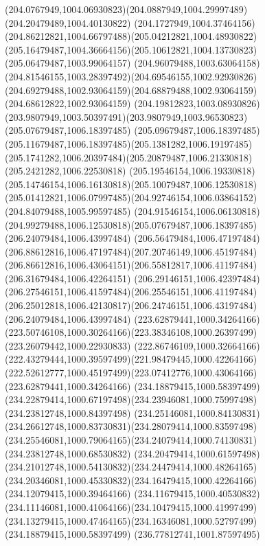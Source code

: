 {    \curveto(204.0767949,1004.06930823)(204.0887949,1004.29997489)(204.20479489,1004.40130822)
    \curveto(204.1727949,1004.37464156)(204.86212821,1004.66797488)(205.04212821,1004.48930822)
    \curveto(205.16479487,1004.36664156)(205.10612821,1004.13730823)(205.06479487,1003.99064157)
    \curveto(204.96079488,1003.63064158)(204.81546155,1003.28397492)(204.69546155,1002.92930826)
    \curveto(204.69279488,1002.93064159)(204.68879488,1002.93064159)(204.68612822,1002.93064159)
    \curveto(204.19812823,1003.08930826)(203.9807949,1003.50397491)(203.9807949,1003.96530823)
    \moveto(205.07679487,1006.18397485)
    \curveto(205.09679487,1006.18397485)(205.11679487,1006.18397485)(205.1381282,1006.19197485)
    \curveto(205.1741282,1006.20397484)(205.20879487,1006.21330818)(205.2421282,1006.22530818)
    \curveto(205.19546154,1006.19330818)(205.14746154,1006.16130818)(205.10079487,1006.12530818)
    \curveto(205.01412821,1006.07997485)(204.92746154,1006.03864152)(204.84079488,1005.99597485)
    \curveto(204.91546154,1006.06130818)(204.99279488,1006.12530818)(205.07679487,1006.18397485)
    \moveto(206.24079484,1006.43997484)
    \curveto(206.56479484,1006.47197484)(206.88612816,1006.47197484)(207.20746149,1006.45197484)
    \curveto(206.86612816,1006.43064151)(206.55812817,1006.41197484)(206.31679484,1006.42264151)
    \curveto(206.29146151,1006.42397484)(206.27546151,1006.41597484)(206.25546151,1006.41197484)
    \curveto(206.25012818,1006.42130817)(206.24746151,1006.43197484)(206.24079484,1006.43997484)
    \moveto(223.62879441,1000.34264166)
    \curveto(223.50746108,1000.30264166)(223.38346108,1000.26397499)(223.26079442,1000.22930833)
    \curveto(222.86746109,1000.32664166)(222.43279444,1000.39597499)(221.98479445,1000.42264166)
    \curveto(222.52612777,1000.45197499)(223.07412776,1000.43064166)(223.62879441,1000.34264166)
    \moveto(234.18879415,1000.58397499)
    \curveto(234.22879414,1000.67197498)(234.23946081,1000.75997498)(234.23812748,1000.84397498)
    \curveto(234.25146081,1000.84130831)(234.26612748,1000.83730831)(234.28079414,1000.83597498)
    \curveto(234.25546081,1000.79064165)(234.24079414,1000.74130831)(234.23812748,1000.68530832)
    \curveto(234.20479414,1000.61597498)(234.21012748,1000.54130832)(234.24479414,1000.48264165)
    \curveto(234.20346081,1000.45330832)(234.16479415,1000.42264166)(234.12079415,1000.39464166)
    \curveto(234.11679415,1000.40530832)(234.11146081,1000.41064166)(234.10479415,1000.41997499)
    \curveto(234.13279415,1000.47464165)(234.16346081,1000.52797499)(234.18879415,1000.58397499)
    \moveto(236.77812741,1001.87597495)
}
